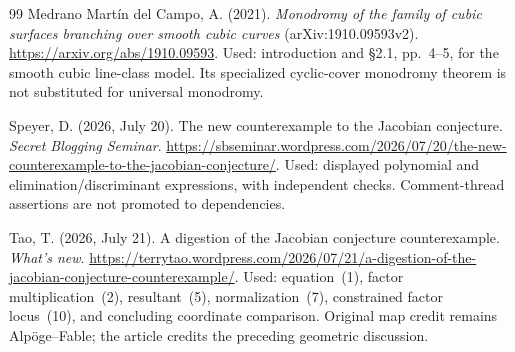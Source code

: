 \documentclass[11pt]{article}
\theoremstyle{remark}\newtheorem{remark}[theorem]{Remark}
\begin{document}
\begin{thebibliography}{99}
Medrano Mart\'in del Campo, A. (2021).
\emph{Monodromy of the family of cubic surfaces branching over smooth cubic curves}
(arXiv:1910.09593v2).
\url{https://arxiv.org/abs/1910.09593}.
Used: introduction and \S2.1, pp.~4--5, for the smooth cubic line-class model. Its specialized cyclic-cover monodromy theorem is not substituted for universal monodromy.

Speyer, D. (2026, July 20).
The new counterexample to the Jacobian conjecture.
\emph{Secret Blogging Seminar}.
\url{https://sbseminar.wordpress.com/2026/07/20/the-new-counterexample-to-the-jacobian-conjecture/}.
Used: displayed polynomial and elimination/discriminant expressions, with independent checks. Comment-thread assertions are not promoted to dependencies.

Tao, T. (2026, July 21).
A digestion of the Jacobian conjecture counterexample.
\emph{What's new}.
\url{https://terrytao.wordpress.com/2026/07/21/a-digestion-of-the-jacobian-conjecture-counterexample/}.
Used: equation~(1), factor multiplication~(2), resultant~(5), normalization~(7), constrained factor locus~(10), and concluding coordinate comparison. Original map credit remains Alp\"oge--Fable; the article credits the preceding geometric discussion.
\end{thebibliography}
\end{document}
